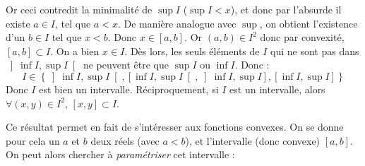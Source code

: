 \documentclass[a4paper,french,bookmarks]{article}
\begin{document}
\begin{nproof}
    \begin{enumerate}
        \itt Or ceci contredit la minimalité de $\sup I$ ($\sup I < x$), et donc par l'absurde il existe $a \in I$, tel que $a < x$. De manière analogue avec $\sup$, on obtient l'existence d'un $b \in I$ tel que $x < b$. Donc $x \in [a, b]$. Or $(a, b) \in I^2$ donc par convexité, $[a, b] \subset I$. On a bien $x \in I$. Dès lors, les seuls éléments de $I$ qui ne sont pas dans $\left]\inf I, \sup I\right[$ ne peuvent être que $\sup I$ ou $\inf I$. Donc :
        \[ I \in \left\{\left]\inf I, \sup I\right[, \left[\inf I, \sup I\right[, \left]\inf I, \sup I\right], \left[\inf I, \sup I\right]\right\}\]
        \itt Donc $I$ est bien un intervalle. Réciproquement, si $I$ est un intervalle, alors $\forall (x, y) \in I^2$, $[x, y] \subset I$.
    \end{enumerate}
\end{nproof}

Ce résultat permet en fait de s'intéresser aux fonctions convexes. On se donne pour cela un $a$ et $b$ deux réels (avec $a < b$), et l'intervalle (donc convexe) $[a, b]$. On peut alors chercher à \textit{paramétriser} cet intervalle :\\
\end{document}
